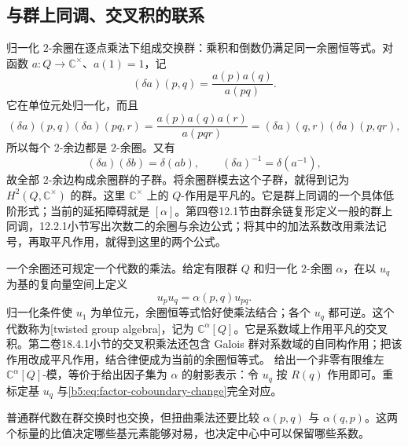 \subsection{与群上同调、交叉积的联系}
\label{b5:subsec:0404:03}

归一化 \(2\)-余圈在逐点乘法下组成交换群：乘积和倒数仍满足同一余圈恒等式。对函数 \(a:Q\to\mathbb C^\times\)、\(a(1)=1\)，记
\[
	(\delta a)(p,q)=\frac{a(p)a(q)}{a(pq)}.
\]
它在单位元处归一化，而且
\[
	(\delta a)(p,q)(\delta a)(pq,r) =\frac{a(p)a(q)a(r)}{a(pqr)} =(\delta a)(q,r)(\delta a)(p,qr),
\]
所以每个 \(2\)-余边都是 \(2\)-余圈。又有
\[
	(\delta a)(\delta b)=\delta(ab),\qquad (\delta a)^{-1}=\delta(a^{-1}),
\]
故全部 \(2\)-余边构成余圈群的子群。将余圈群模去这个子群，就得到记为 \(H^2(Q,\mathbb C^\times)\) 的群。这里 \(\mathbb C^\times\) 上的 \(Q\)-作用是平凡的。它是群上同调的一个具体低阶形式；当前的延拓障碍就是 \([\alpha]\)。第四卷12.1节由群余链复形定义一般的群上同调，12.2.1小节写出次数二的余圈与余边公式；将其中的加法系数改用乘法记号，再取平凡作用，就得到这里的两个公式。

\ProseParagraphBreak

一个余圈还可规定一个代数的乘法。给定有限群 \(Q\) 和归一化 \(2\)-余圈 \(\alpha\)，在以 \(u_q\) 为基的复向量空间上定义
\[
	u_pu_q=\alpha(p,q)u_{pq}.
\]
归一化条件使 \(u_1\) 为单位元，余圈恒等式恰好使乘法结合；各个 \(u_q\) 都可逆。这个代数称为[twisted group algebra]，记为 \(\mathbb C^\alpha[Q]\)。它是系数域上作用平凡的交叉积。第二卷18.4.1小节的交叉积乘法还包含 Galois 群对系数域的自同构作用；把该作用改成平凡作用，结合律便成为当前的余圈恒等式。
给出一个非零有限维左 \(\mathbb C^\alpha[Q]\)-模，等价于给出因子集为 \(\alpha\) 的射影表示：令 \(u_q\) 按 \(R(q)\) 作用即可。重标定基 \(u_q\) 与\eqref{b5:eq:factor-coboundary-change}完全对应。

\ProseParagraphBreak
普通群代数在群交换时也交换，但扭曲乘法还要比较 \(\alpha(p,q)\) 与 \(\alpha(q,p)\)。这两个标量的比值决定哪些基元素能够对易，也决定中心中可以保留哪些系数。

